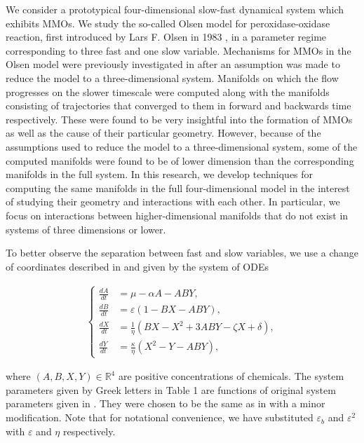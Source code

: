 \documentclass{ws-ijbc}
\begin{document}
We consider a prototypical four-dimensional slow-fast dynamical system which exhibits MMOs.  We study the so-called Olsen model for peroxidase-oxidase reaction, first introduced by Lars F. Olsen in 1983  \cite{Olsen}, in a parameter regime corresponding to three fast and one slow variable.  Mechanisms for MMOs in the Olsen model were previously investigated in \cite{QSSA} after an assumption was made to reduce the model to a three-dimensional system.  Manifolds on which the flow progresses on the slower timescale were computed along with the manifolds consisting of trajectories that converged to them in forward and backwards time respectively.  These were found to be very insightful into the formation of MMOs as well as the cause of their particular geometry.  However, because of the assumptions used to reduce the model to a three-dimensional system, some of the computed manifolds were found to be of lower dimension than the corresponding manifolds in the full system.  In this research, we develop techniques for computing the same manifolds in the full four-dimensional model in the interest of studying their geometry and interactions with each other.  In particular, we focus on interactions between higher-dimensional manifolds that do not exist in systems of three dimensions or lower.


To better observe the separation between fast and slow variables, we use a change of coordinates described in \cite{Rescaling} and given by the system of ODEs
    
\begin{equation}
\begin{aligned}
\begin{cases}
\frac{dA}{dt} &= \mu - \alpha A - ABY, \\
\frac{dB}{dt} &= \varepsilon(1-BX - ABY), \\
\frac{dX}{dt} &= \frac{1}{\eta}(BX - X^2 +3ABY - \zeta X + \delta), \\
\frac{dY}{dt} &= \frac{\kappa}{\eta}(X^2 - Y - ABY),
\end{cases}
\end{aligned}
\label{equation_1}
\end{equation}
    
\noindent
where $(A, B, X, Y)\in\mathbb{R}^{4}$ are positive concentrations of chemicals.  The system parameters given by Greek letters in Table 1 are functions of original system parameters given in \cite{Olsen}. They were chosen to be the same as in \cite{Rescaling} with a minor modification.  Note that for notational convenience, we have substituted  $\varepsilon_{b}$ and $\varepsilon^{2}$ \cite{Rescaling} with $\varepsilon$ and $\eta$ respectively.
\end{document}
